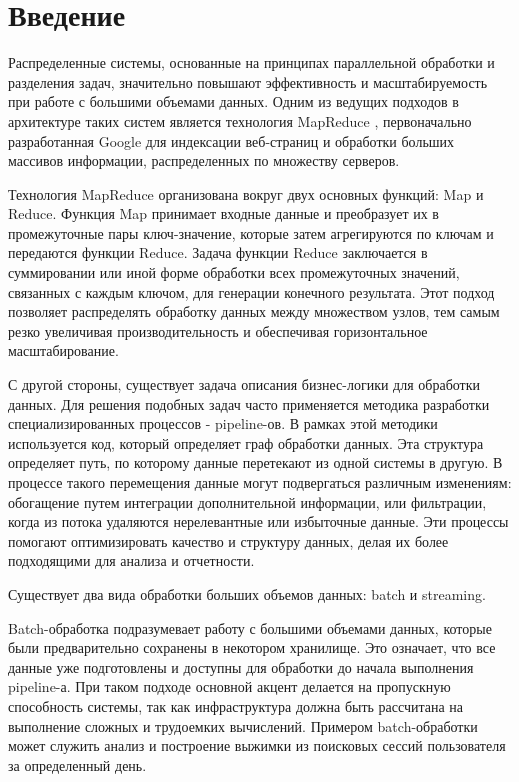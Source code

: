 \section{Введение}
\label{sec:intro}

Распределенные системы, основанные на принципах параллельной обработки и разделения задач, значительно повышают эффективность и масштабируемость при работе с большими объемами данных. Одним из ведущих подходов в архитектуре таких систем является технология MapReduce \cite{mapreduce}, первоначально разработанная Google для индексации веб-страниц и обработки больших массивов информации, распределенных по множеству серверов.

Технология MapReduce организована вокруг двух основных функций: Map и Reduce. Функция Map принимает входные данные и преобразует их в промежуточные пары ключ-значение, которые затем агрегируются по ключам и передаются функции Reduce. Задача функции Reduce заключается в суммировании или иной форме обработки всех промежуточных значений, связанных с каждым ключом, для генерации конечного результата. Этот подход позволяет распределять обработку данных между множеством узлов, тем самым резко увеличивая производительность и обеспечивая горизонтальное масштабирование.

С другой стороны, существует задача описания бизнес-логики для обработки данных. Для решения подобных задач часто применяется методика разработки специализированных процессов - pipeline-ов. В рамках этой методики используется код, который определяет граф обработки данных. Эта структура определяет путь, по которому данные перетекают из одной системы в другую. В процессе такого перемещения данные могут подвергаться различным изменениям: обогащение путем интеграции дополнительной информации, или фильтрации, когда из потока удаляются нерелевантные или избыточные данные. Эти процессы помогают оптимизировать качество и структуру данных, делая их более подходящими для анализа и отчетности.

Существует два вида обработки больших объемов данных: batch и streaming.

Batch-обработка подразумевает работу с большими объемами данных, которые были предварительно сохранены в некотором хранилище. Это означает, что все данные уже подготовлены и доступны для обработки до начала выполнения pipeline-а. При таком подходе основной акцент делается на пропускную способность системы, так как инфраструктура должна быть рассчитана на выполнение сложных и трудоемких вычислений. Примером batch-обработки может служить анализ и построение выжимки из поисковых сессий пользователя за определенный день.

